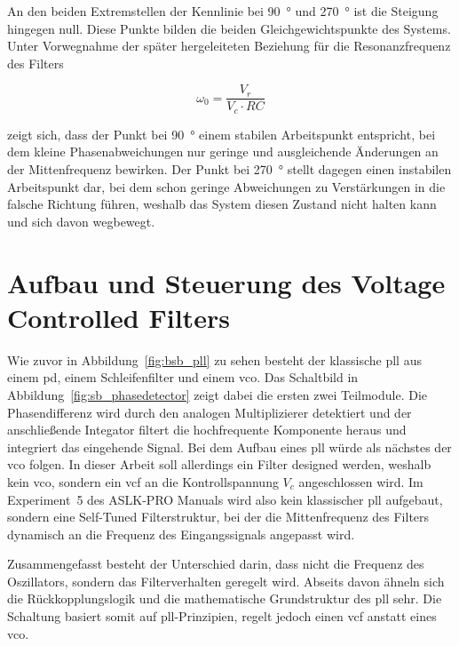 \documentclass[../main.tex]{subfiles}
\begin{document}
An den beiden Extremstellen der Kennlinie bei \SI{90}{\degree} und \SI{270}{\degree} ist die Steigung hingegen null. Diese Punkte bilden die beiden Gleichgewichtspunkte des Systems. Unter Vorwegnahme der später hergeleiteten Beziehung für die Resonanzfrequenz des Filters

\begin{equation*}
    \omega_0= \frac{V_r}{V_c \cdot RC}
\end{equation*}

zeigt sich, dass der Punkt bei \SI{90}{\degree} einem stabilen Arbeitspunkt entspricht, bei dem kleine Phasenabweichungen nur geringe und ausgleichende Änderungen an der Mittenfrequenz bewirken. Der Punkt bei \SI{270}{\degree} stellt dagegen einen instabilen Arbeitspunkt dar, bei dem schon geringe Abweichungen zu Verstärkungen in die falsche Richtung führen, weshalb das System diesen Zustand nicht halten kann und sich davon wegbewegt.\par


\section{Aufbau und Steuerung des Voltage Controlled Filters}
\label{sec:VCF}

Wie zuvor in Abbildung~\ref{fig:bsb_pll} zu sehen besteht der klassische \gls{pll} aus einem \gls{pd}, einem Schleifenfilter und einem \gls{vco}. Das Schaltbild in Abbildung~\ref{fig:sb_phasedetector} zeigt dabei die ersten zwei Teilmodule. Die Phasendifferenz wird durch den analogen Multiplizierer detektiert und der anschließende Integator filtert die hochfrequente Komponente heraus und integriert das eingehende Signal. Bei dem Aufbau eines \gls{pll} würde als nächstes der \gls{vco} folgen. In dieser Arbeit soll allerdings ein Filter designed werden, weshalb kein \gls{vco}, sondern ein \gls{vcf} an die Kontrollspannung $V_c$ angeschlossen wird. Im Experiment~\num{5} des ASLK-PRO Manuals wird also kein klassischer \gls{pll} aufgebaut, sondern eine Self-Tuned Filterstruktur, bei der die Mittenfrequenz des Filters dynamisch an die Frequenz des Eingangssignals angepasst wird.\par
\medskip

Zusammengefasst besteht der Unterschied darin, dass nicht die Frequenz des Oszillators, sondern das Filterverhalten geregelt wird. Abseits davon ähneln sich die Rückkopplungslogik und die mathematische Grundstruktur des \gls{pll} sehr. Die Schaltung basiert somit auf \gls{pll}-Prinzipien, regelt jedoch einen \gls{vcf} anstatt eines \gls{vco}.\par
\medskip
\end{document}
